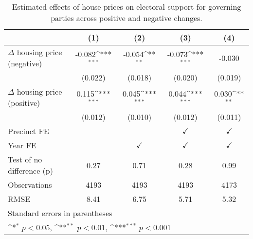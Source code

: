 \begin{table}[htbp]\centering
\def\sym#1{\ifmmode^{#1}\else\(^{#1}\)\fi}
\caption{Estimated effects of house prices on electoral support for governing parties across positive and negative changes.} \label{preposneg}
\begin{tabular}{l*{4}{c}}
\hline\hline
                    &\multicolumn{1}{c}{(1)}         &\multicolumn{1}{c}{(2)}         &\multicolumn{1}{c}{(3)}         &\multicolumn{1}{c}{(4)}         \\
\hline
$\Delta$ housing price (negative)&      -0.082\sym{***}&      -0.054\sym{**} &      -0.073\sym{***}&      -0.030         \\
                    &     (0.022)         &     (0.018)         &     (0.020)         &     (0.019)         \\
[1em]
$\Delta$ housing price (positive)&       0.115\sym{***}&       0.045\sym{***}&       0.044\sym{***}&       0.030\sym{**} \\
                    &     (0.012)         &     (0.010)         &     (0.012)         &     (0.011)         \\
[1em]
\hline Precinct FE  &                     &                     &$\checkmark$         &$\checkmark$         \\
[1em]
Year FE             &                     &$\checkmark$         &$\checkmark$         &$\checkmark$         \\
\hline
Test of no difference (p)&        0.27         &        0.71         &        0.28         &        0.99         \\
Observations        &        4193         &        4193         &        4193         &        4173         \\
RMSE                &        8.41         &        6.75         &        5.71         &        5.32         \\
\hline\hline
\multicolumn{5}{l}{\footnotesize Standard errors in parentheses}\\
\multicolumn{5}{l}{\footnotesize \sym{*} \(p<0.05\), \sym{**} \(p<0.01\), \sym{***} \(p<0.001\)}\\
\end{tabular}
\end{table}
